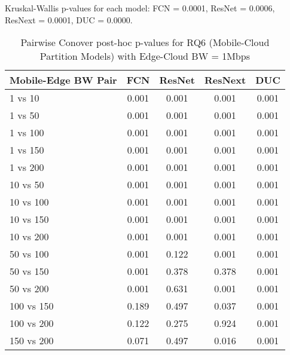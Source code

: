 \begin{table}[h]
\centering
\caption{Pairwise Conover post-hoc p-values for RQ6 (Mobile-Cloud Partition Models) with Edge-Cloud BW = 1Mbps}
\label{tab:conover_mobile_cloud_partition_ec1}
\smallskip
Kruskal-Wallis p-values for each model: FCN = 0.0001, ResNet = 0.0006, ResNext = 0.0001, DUC = 0.0000.

\begin{tabular}{lcccc}
\toprule
Mobile-Edge BW Pair & FCN & ResNet & ResNext & DUC \\
\midrule
1 vs 10 & 0.001 & 0.001 & 0.001 & 0.001 \\
1 vs 50 & 0.001 & 0.001 & 0.001 & 0.001 \\
1 vs 100 & 0.001 & 0.001 & 0.001 & 0.001 \\
1 vs 150 & 0.001 & 0.001 & 0.001 & 0.001 \\
1 vs 200 & 0.001 & 0.001 & 0.001 & 0.001 \\
10 vs 50 & 0.001 & 0.001 & 0.001 & 0.001 \\
10 vs 100 & 0.001 & 0.001 & 0.001 & 0.001 \\
10 vs 150 & 0.001 & 0.001 & 0.001 & 0.001 \\
10 vs 200 & 0.001 & 0.001 & 0.001 & 0.001 \\
50 vs 100 & 0.001 & 0.122 & 0.001 & 0.001 \\
50 vs 150 & 0.001 & 0.378 & 0.378 & 0.001 \\
50 vs 200 & 0.001 & 0.631 & 0.001 & 0.001 \\
100 vs 150 & 0.189 & 0.497 & 0.037 & 0.001 \\
100 vs 200 & 0.122 & 0.275 & 0.924 & 0.001 \\
150 vs 200 & 0.071 & 0.497 & 0.016 & 0.001 \\
\bottomrule
\end{tabular}
\end{table}

